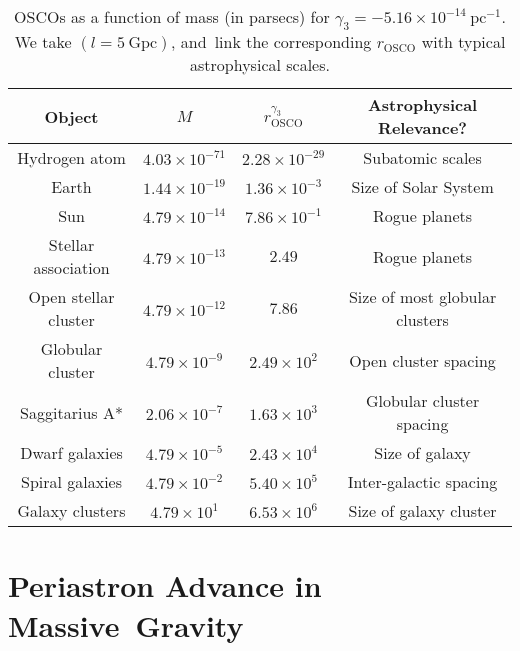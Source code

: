 \documentclass[aps,amsmath,amssymb,twocolumn]{revtex4}
\begin{document}
\begin{table*}[ht!]
\centering
\begin{tabular}{| c | c | c | c |} 
\hline
    Object & $M$  & $r^{\gamma_3}_{\text{OSCO}}$ & Astrophysical Relevance?  
    \\ [0.5ex] 
       \hline
    \hline
   Hydrogen atom  & $ 4.03 \times 10^{-71} $  
    & $2.28 \times 10^{-29}$  & Subatomic scales
    \\ [0.5ex] 
   \hline
   Earth & $ 1.44 \times 10^{-19} $ 
   & $1.36 \times 10^{-3}$  & Size of Solar System
   \\
   \hline
   Sun & $ 4.79 \times 10^{-14} $ 
   & $7.86 \times 10^{-1}$  & Rogue planets
    \\
   \hline
   Stellar association & $ 4.79 \times 10^{-13} $ 
   & $2.49                     $  & Rogue planets
   \\
   \hline
  Open stellar cluster & $ 4.79 \times 10^{-12} $ 
   & $7.86                     $  & Size of most globular clusters
  \\
   \hline
   Globular cluster & $ 4.79 \times 10^{-9} $
   & $2.49 \times 10^{2}$  & Open cluster spacing
   \\
   \hline
  Saggitarius A* & $ 2.06 \times 10^{-7} $ 
   & $1.63 \times 10^{3}$  & Globular cluster spacing
  \\
   \hline
    Dwarf galaxies & $ 4.79 \times 10^{-5} $ 
    & $2.43 \times 10^{4}$  & Size of galaxy
    \\
   \hline
    Spiral galaxies & $ 4.79 \times 10^{-2} $ 
   & $5.40 \times 10^{5}$  & Inter-galactic spacing
    \\
   \hline
    Galaxy clusters & $ 4.79 \times 10^{1}$ 
   & $6.53 \times 10^{6}$  & Size of galaxy cluster
     \\
   \hline
\end{tabular}
\caption{
OSCOs  as a function of mass (in parsecs) for $\gamma_3 = -5.16 \times 10^{-14} \ \text{pc}^{-1}$. We take $(l= 5 \ \text{Gpc})$, and~link the corresponding $r_{\text{OSCO}}$ with typical astrophysical scales. 
\label{numerical_table_II}
}
\end{table*}


\section{Periastron Advance in Massive~Gravity\label{sec3}}
\end{document}
